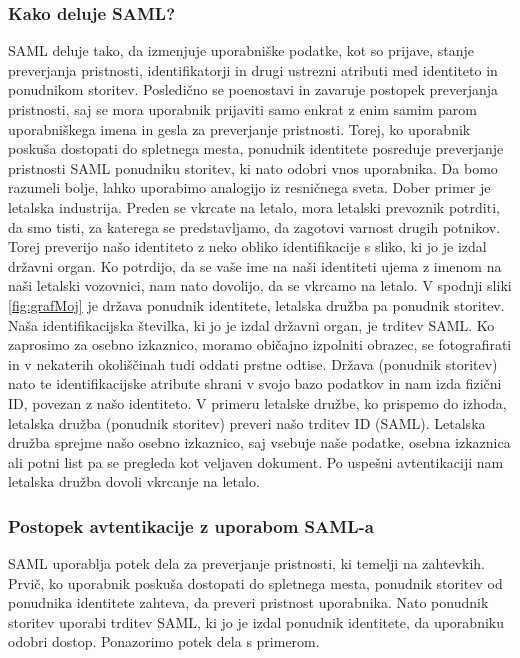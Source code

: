 \documentclass[a4paper,12pt,openright]{book}
\begin{document}
\subsubsection{Kako deluje SAML?}
SAML deluje tako, da izmenjuje uporabniške podatke, kot so prijave, stanje preverjanja pristnosti, identifikatorji in drugi ustrezni atributi med identiteto in ponudnikom storitev. Posledično se poenostavi in zavaruje postopek preverjanja pristnosti, saj se mora uporabnik prijaviti samo enkrat z enim samim parom uporabniškega imena in gesla za preverjanje pristnosti. Torej, ko uporabnik poskuša dostopati do spletnega mesta, ponudnik identitete posreduje preverjanje pristnosti SAML ponudniku storitev, ki nato odobri vnos uporabnika. Da bomo razumeli bolje, lahko uporabimo analogijo iz resničnega sveta.
\newline
Dober primer je letalska industrija. Preden se vkrcate na letalo, mora letalski prevoznik potrditi, da smo tisti, za katerega se predstavljamo, da zagotovi varnost drugih potnikov. Torej preverijo našo identiteto z neko obliko identifikacije s sliko, ki jo je izdal državni organ. Ko potrdijo, da se vaše ime na naši identiteti ujema z imenom na naši letalski vozovnici, nam nato dovolijo, da se vkrcamo na letalo.
\newline
V spodnji sliki \ref{fig:grafMoj} je država ponudnik identitete, letalska družba pa ponudnik storitev. Naša identifikacijska številka, ki jo je izdal državni organ, je trditev SAML. Ko zaprosimo za osebno izkaznico, moramo običajno izpolniti obrazec, se fotografirati in v nekaterih okoliščinah tudi oddati prstne odtise. Država (ponudnik storitev) nato te identifikacijske atribute shrani v svojo bazo podatkov in nam izda fizični ID, povezan z našo identiteto. V primeru letalske družbe, ko prispemo do izhoda, letalska družba (ponudnik storitev) preveri našo trditev ID (SAML). Letalska družba sprejme našo osebno izkaznico, saj vsebuje naše podatke, osebna izkaznica ali potni list pa se pregleda kot veljaven dokument. Po uspešni avtentikaciji nam letalska družba dovoli vkrcanje na letalo.

\subsubsection{Postopek avtentikacije z uporabom SAML-a}

SAML uporablja potek dela za preverjanje pristnosti, ki temelji na zahtevkih. Prvič, ko uporabnik poskuša dostopati do spletnega mesta, ponudnik storitev od ponudnika identitete zahteva, da preveri pristnost uporabnika. Nato ponudnik storitev uporabi trditev SAML, ki jo je izdal ponudnik identitete, da uporabniku odobri dostop. Ponazorimo potek dela s primerom.
\end{document}
